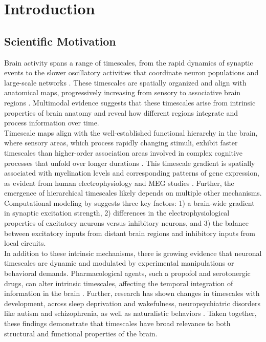 \documentclass[latex/main.tex]{subfiles}
\begin{document}
\section{Introduction}

\subsection{Scientific Motivation} 
Brain activity spans a range of timescales, from the rapid dynamics of synaptic events to the slower oscillatory activities that coordinate neuron populations and large-scale networks \citep{buzsaki_large-scale_2004}. These timescales are spatially organized and align with anatomical maps, progressively increasing from sensory to associative brain regions \citep{raut_hierarchical_2020, gao_neuronal_2020, hasson_hierarchy_2008}. Multimodal evidence suggests that these timescales arise from intrinsic properties of brain anatomy and reveal how different regions integrate and process information over time.\\

Timescale maps align with the well-established functional hierarchy in the brain, where sensory areas, which process rapidly changing stimuli, exhibit faster timescales than higher-order association areas involved in complex cognitive processes that unfold over longer durations \citep{murray_hierarchy_2014, hasson_hierarchy_2008, stephens_place_2013}. This timescale gradient is spatially associated with myelination levels and corresponding patterns of gene expression, as evident from human electrophysiology and MEG studies \cite{gao_neuronal_2020, shafiei_neurophysiological_2023}. Further, the emergence of hierarchical timescales likely depends on multiple other mechanisms. Computational modeling by \citet{li_hierarchical_2022} suggests three key factors: 1) a brain-wide gradient in synaptic excitation strength, 2) differences in the electrophysiological properties of excitatory neurons versus inhibitory neurons, and 3) the balance between excitatory inputs from distant brain regions and inhibitory inputs from local circuits.\\

In addition to these intrinsic mechanisms, there is growing evidence that neuronal timescales are dynamic and modulated by experimental manipulations or behavioral demands. Pharmacological agents, such a propofol and serotonergic drugs, can alter intrinsic timescales, affecting the temporal integration of information in the brain \citep{huang_timescales_2018, shinn_functional_2023}. Further, research has shown changes in timescales with development, across sleep deprivation and wakefulness, neuropsychiatric disorders like autism and schizophrenia, as well as naturalistic behaviors \citep{martin-burgos_development_2024, meisel_decline_2017, watanabe_atypical_2019, wengler_distinct_2020, manea_neural_2024}. Taken together, these findings demonstrate that timescales have broad relevance to both structural and functional properties of the brain.\\
\end{document}
